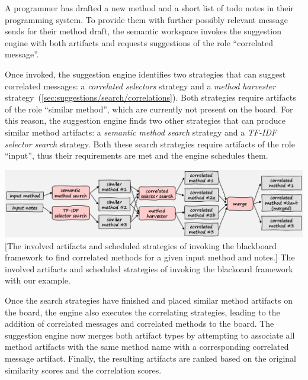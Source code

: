 \begin{example}
	A programmer has drafted a new method and a short list of todo notes in their programming system.
	To provide them with further possibly relevant message sends for their method draft, the semantic workspace invokes the suggestion engine with both artifacts and requests suggestions of the role ``correlated message''.

	Once invoked, the suggestion engine identifies two strategies that can suggest correlated messages: a \emph{correlated selectors} strategy and a \emph{method harvester} strategy~(\cref{sec:suggestions/search/correlations}).
	Both strategies require artifacts of the role ``similar method'', which are currently not present on the board.
	For this reason, the suggestion engine finds two other strategies that can produce similar method artifacts: a \emph{semantic method search} strategy and a \emph{TF-IDF selector search} strategy.
	Both these search strategies require artifacts of the role ``input'', thus their requirements are met and the engine schedules them.

	\vspace{\baselineskip}
	\begin{center}
		\includegraphics[width=\textwidth]{02_suggestions/example.png}
		[The involved artifacts and scheduled strategies of invoking the blackboard framework to find correlated methods for a given input method and notes.]{
			The involved artifacts and scheduled strategies of invoking the blackoard framework with our example.
		}
		\label{fig:design/suggestions/example}
	\end{center}

	Once the search strategies have finished and placed similar method artifacts on the board, the engine also executes the correlating strategies, leading to the addition of correlated messages and correlated methods to the board.
	The suggestion engine now merges both artifact types by attempting to associate all method artifacts with the same method name with a corresponding correlated message artifact.
	Finally, the resulting artifacts are ranked based on the original similarity scores and the correlation scores.
\end{example}

